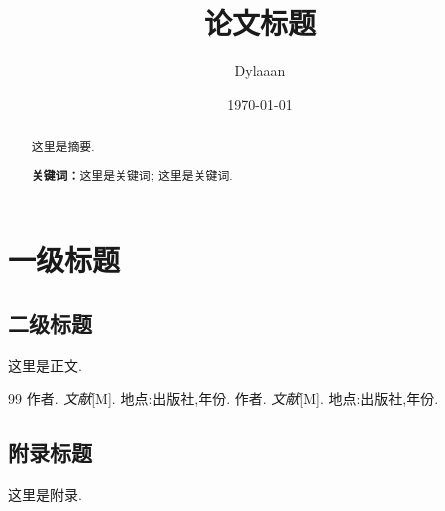\documentclass{article}
\title{\textbf{论文标题}}
\author{Dylaaan}
\date{\today}
\begin{document}
\maketitle

\setcounter{page}{0}
\maketitle
\thispagestyle{empty}

\begin{abstract}
    这里是摘要. 
    \par\textbf{关键词：}这里是关键词; 这里是关键词. 
\end{abstract}

\newpage
{}
\setcounter{page}{1}
\tableofcontents
\newpage
\setcounter{page}{1}

\section{一级标题}

\subsection{二级标题}

这里是正文. 

\newpage

\begin{thebibliography}{99}
    作者. \emph{文献}[M]. 地点:出版社,年份.
    作者. \emph{文献}[M]. 地点:出版社,年份.
\end{thebibliography}

\newpage

\begin{appendices}
    \renewcommand{\thesection}{\Alph{section}}
    \section{附录标题}
        这里是附录. 
\end{appendices}
\end{document}
